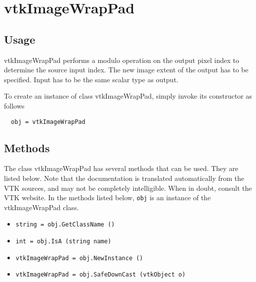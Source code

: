 \section{vtkImageWrapPad}

\subsection{Usage}

 vtkImageWrapPad performs a modulo operation on the output pixel index
 to determine the source input index.  The new image extent of the
 output has to be specified.  Input has to be the same scalar type as 
 output.

To create an instance of class vtkImageWrapPad, simply
invoke its constructor as follows
\begin{verbatim}
  obj = vtkImageWrapPad
\end{verbatim}
\subsection{Methods}

The class vtkImageWrapPad has several methods that can be used.
  They are listed below.
Note that the documentation is translated automatically from the VTK sources,
and may not be completely intelligible.  When in doubt, consult the VTK website.
In the methods listed below, \verb|obj| is an instance of the vtkImageWrapPad class.
\begin{itemize}
\item  \verb|string = obj.GetClassName ()|

\item  \verb|int = obj.IsA (string name)|

\item  \verb|vtkImageWrapPad = obj.NewInstance ()|

\item  \verb|vtkImageWrapPad = obj.SafeDownCast (vtkObject o)|

\end{itemize}
